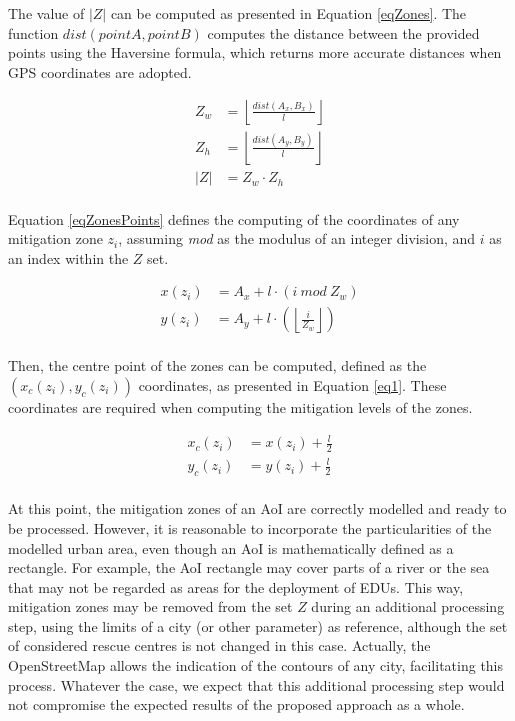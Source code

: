 \begin{refsection}
The value of $|Z|$ can be computed as presented in Equation \ref{eqZones}. The function $dist(pointA, pointB)$ computes the distance between the provided points using the Haversine formula, which returns more accurate distances when GPS coordinates are adopted. 

\begin{equation}
    \begin{split}
        \displaystyle Z_w &= \left\lfloor \frac{dist(A_x,B_x)}{l} \right\rfloor\\
        \displaystyle Z_h &= \left\lfloor \frac{dist(A_y,B_y)}{l} \right\rfloor\\
        \displaystyle \lvert Z \rvert &= Z_w \cdot Z_h\\
    \end{split}	
    \label{eqZones}
\end{equation}

Equation \ref{eqZonesPoints} defines the computing of the coordinates of any mitigation zone $z_i$, assuming \textit{mod} as the modulus of an integer division, and $i$ as an index within the $Z$ set.

\begin{equation}
    \begin{split}
        \displaystyle x(z_i) &= A_x + l \cdot (i\ mod\ Z_w)\\
        \displaystyle y(z_i) &= A_y + l \cdot \left(\left\lfloor \frac{i}{Z_w} \right\rfloor\right)\\
    \end{split}	
    \label{eqZonesPoints}
\end{equation}

Then, the centre point of the zones can be computed, defined as the $(x_c(z_i),y_c(z_i))$ coordinates, as presented in Equation \ref{eq1}. These coordinates are required when computing the mitigation levels of the zones.

\begin{equation}
    \begin{split}
        \displaystyle x_c(z_i) &= x(z_i) + \frac{l}{2}\\
        \displaystyle y_c(z_i) &= y(z_i) + \frac{l}{2}\\
    \end{split}	
    \label{eq1}
\end{equation}

At this point, the mitigation zones of an AoI are correctly modelled and ready to be processed. However, it is reasonable to incorporate the particularities of the modelled urban area, even though an AoI is mathematically defined as a rectangle. For example, the AoI rectangle may cover parts of a river or the sea that may not be regarded as areas for the deployment of EDUs. This way, mitigation zones may be removed from the set $Z$ during an additional processing step, using the limits of a city (or other parameter) as reference, although the set of considered rescue centres is not changed in this case. Actually, the OpenStreetMap allows the indication of the contours of any city, facilitating this process. Whatever the case, we expect that this additional processing step would not compromise the expected results of the proposed approach as a whole.


\end{refsection}
